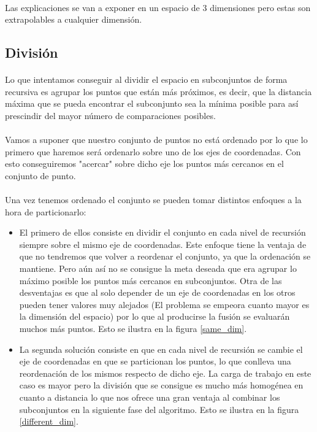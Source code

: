 \documentclass{article}
\begin{document}
	\paragraph{}
	Las explicaciones se van a exponer en un espacio de 3 dimensiones pero estas son extrapolables a cualquier dimensión.

	\subsection{División}
		
		\paragraph{}
		Lo que intentamos conseguir al dividir el espacio en subconjuntos de forma recursiva es agrupar los puntos que están más próximos, es decir, que la distancia máxima que se pueda encontrar el subconjunto sea la mínima posible para así prescindir del mayor número de comparaciones posibles. 
		
		\paragraph{}
		Vamos a suponer que nuestro conjunto de puntos no está ordenado por lo que lo primero que haremos será ordenarlo sobre uno de los ejes de coordenadas. Con esto conseguiremos "acercar" sobre dicho eje los puntos más cercanos en el conjunto de punto.
		
		\paragraph{}
		Una vez tenemos ordenado el conjunto se pueden tomar distintos enfoques a la hora de particionarlo:
		
		\begin{itemize}

			\item
			El primero de ellos consiste en dividir el conjunto en cada nivel de recursión siempre sobre el mismo eje de coordenadas. Este enfoque tiene la ventaja de que no tendremos que volver a reordenar el conjunto, ya que la ordenación se mantiene. Pero aún así no se consigue la meta deseada que era agrupar lo máximo posible los puntos más cercanos en subconjuntos. Otra de las desventajas es que al solo depender de un eje de coordenadas en los otros pueden tener valores muy alejados (El problema se empeora cuanto mayor es la dimensión del espacio) por lo que al producirse la fusión se evaluarán muchos más puntos. Esto se ilustra en la figura \ref{same_dim}.

			\item
			La segunda solución consiste en que en cada nivel de recursión se cambie el eje de coordenadas en que se particionan los puntos, lo que conlleva una reordenación de los mismos respecto de dicho eje. La carga de trabajo en este caso es mayor pero la división que se consigue es mucho más homogénea en cuanto a distancia lo que nos ofrece una gran ventaja al combinar los subconjuntos en la siguiente fase del algoritmo. Esto se ilustra en la figura \ref{different_dim}.

		\end{itemize}
		
\end{document}
